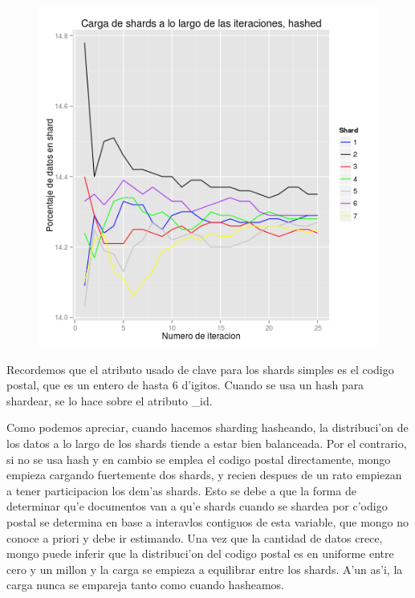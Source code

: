 \begin{figure}[H]
	\begin{center}
		\includegraphics[scale=0.6]{imagenes/siete_shards_hashed.png}
	\end{center}
\end{figure}

Recordemos que el atributo usado de clave para los shards simples es el codigo postal, que es un entero de hasta 6 d'igitos. Cuando se usa un hash para shardear, se lo hace sobre el atributo \_id.

Como podemos apreciar, cuando hacemos sharding hasheando, la distribuci'on de los datos a lo largo de los shards tiende a estar bien balanceada. Por el contrario, si no se usa hash y en cambio se emplea el codigo postal directamente, mongo empieza cargando fuertemente dos shards, y recien despues de un rato empiezan a tener participacion los dem'as shards. Esto se debe a que la forma de determinar qu'e documentos van a qu'e shards cuando se shardea por c'odigo postal se determina en base a interavlos contiguos de esta variable, que mongo no conoce a priori y debe ir estimando. Una vez que la cantidad de datos crece, mongo puede inferir que la distribuci'on del codigo postal es en uniforme entre cero y un millon y la carga se empieza a equilibrar entre los shards. A'un as'i, la carga nunca se empareja tanto como cuando hasheamos.

